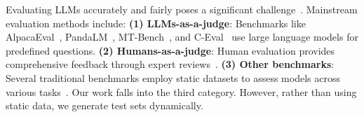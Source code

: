 
Evaluating LLMs accurately and fairly poses a significant challenge~\citep{chang2024survey}. Mainstream evaluation methods include: \textbf{(1) LLMs-as-a-judge}: Benchmarks like AlpacaEval~\citep{li2023alpacaeval}, PandaLM~\citep{wang2023pandalm}, MT-Bench~\citep{zheng2023judging}, and C-Eval~\citep{huang2024c} use large language models for predefined questions.
\textbf{(2) Humans-as-a-judge}: Human evaluation provides comprehensive feedback through expert reviews~\citep{ribeiro2022adaptive,gao2023adaptive}. \textbf{(3) Other benchmarks}: Several traditional benchmarks employ static datasets to assess models across various tasks~\citep{liang2022holistic,hendrycks2020measuring,hendrycks2021measuring}. 
Our work falls into the third category. However, rather than using static data, we generate test sets dynamically.


